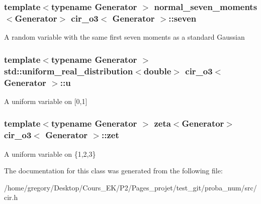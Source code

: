 \subsubsection[{\texorpdfstring{seven}{seven}}]{\setlength{\rightskip}{0pt plus 5cm}template$<$typename Generator $>$ {\bf normal\+\_\+seven\+\_\+moments}$<$Generator$>$ {\bf cir\+\_\+o3}$<$ Generator $>$\+::seven\hspace{0.3cm}{\ttfamily [protected]}}\hypertarget{classcir__o3_a22d7ad16bc9bfb168095ab16ff0bc685}{}\label{classcir__o3_a22d7ad16bc9bfb168095ab16ff0bc685}
A random variable with the same first seven moments as a standard Gaussian 
\subsubsection[{\texorpdfstring{u}{u}}]{\setlength{\rightskip}{0pt plus 5cm}template$<$typename Generator $>$ std\+::uniform\+\_\+real\+\_\+distribution$<$double$>$ {\bf cir\+\_\+o3}$<$ Generator $>$\+::u\hspace{0.3cm}{\ttfamily [protected]}}\hypertarget{classcir__o3_a0e08c2c516a7f821a4a3ee8f9b0cf162}{}\label{classcir__o3_a0e08c2c516a7f821a4a3ee8f9b0cf162}
A uniform variable on \mbox{[}0,1\mbox{]} 
\subsubsection[{\texorpdfstring{zet}{zet}}]{\setlength{\rightskip}{0pt plus 5cm}template$<$typename Generator $>$ {\bf zeta}$<$Generator$>$ {\bf cir\+\_\+o3}$<$ Generator $>$\+::zet\hspace{0.3cm}{\ttfamily [protected]}}\hypertarget{classcir__o3_aff6081fa06fbab8fd8bf06bbef2bf7c4}{}\label{classcir__o3_aff6081fa06fbab8fd8bf06bbef2bf7c4}
A uniform variable on \{1,2,3\} 

The documentation for this class was generated from the following file\+:\begin{DoxyCompactItemize}
\item 
/home/gregory/\+Desktop/\+Cours\+\_\+\+E\+K/\+P2/\+Pages\+\_\+projet/test\+\_\+git/proba\+\_\+num/src/cir.\+h\end{DoxyCompactItemize}
